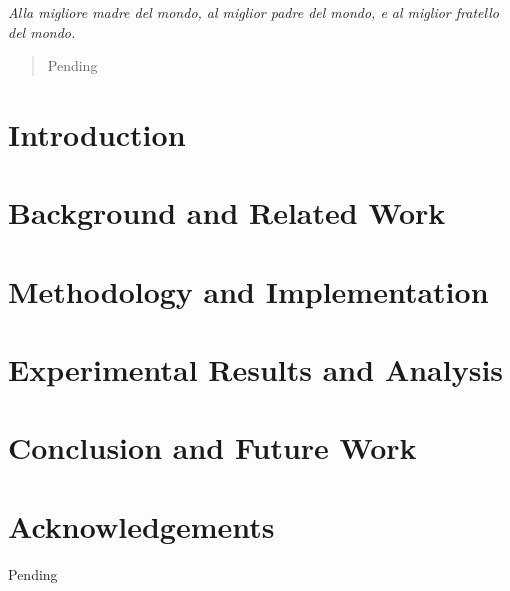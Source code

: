 \documentclass[12pt,a4paper,openright,twoside]{report}
\begin{document}

\clearpage{\pagestyle{empty}\cleardoublepage}
\begin{titlepage}
	\setcounter{page}{3}
	\thispagestyle{empty}
	\topmargin=6.5cm
	\raggedleft
	\large
	\em
	Alla migliore madre del mondo,\linebreak
	al miglior padre del mondo,\linebreak
	e al miglior fratello del mondo.
	\newpage
	\clearpage{\pagestyle{empty}\cleardoublepage}
\end{titlepage}
\clearpage{\pagestyle{empty}\cleardoublepage}
\begin{abstract}
	\setcounter{page}{3}
	Pending
\end{abstract}
\clearpage{\pagestyle{empty}\cleardoublepage}
\clearpage{\pagestyle{empty}\cleardoublepage}
\tableofcontents
{}
\listoffigures
\clearpage{\pagestyle{empty}\cleardoublepage}

\clearpage{\pagestyle{empty}\cleardoublepage}

\chapter{Introduction}
\label{chap:intro}
\lhead[\fancyplain{}{\bfseries\thepage}]{\fancyplain{}{\bfseries\rightmark}}


\chapter{Background and Related Work}
\label{chap:background}
\lhead[\fancyplain{}{\bfseries\thepage}]{\fancyplain{}{\bfseries\rightmark}}


\chapter{Methodology and Implementation}
\label{chap:methodology}
\lhead[\fancyplain{}{\bfseries\thepage}]{\fancyplain{}{\bfseries\rightmark}}


\chapter{Experimental Results and Analysis}
\label{chap:results}
\lhead[\fancyplain{}{\bfseries\thepage}]{\fancyplain{}{\bfseries\rightmark}}


\chapter{Conclusion and Future Work}
\label{chap:conclusion}
\lhead[\fancyplain{}{\bfseries\thepage}]{\fancyplain{}{\bfseries\rightmark}}




\chapter*{Acknowledgements}
Pending
\end{document}
